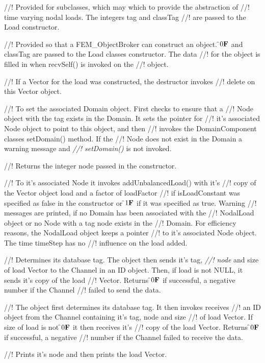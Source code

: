 //! Provided for subclasses, which may which to provide the abstraction of
//! time varying nodal loads. The integers \p tag and \p classTag
//! are passed to the Load constructor.

//! Provided so that a FEM\_ObjectBroker can construct an object. \f$0{\bf F}$ and
\p classTag are passed to the Load classes constructor. The data
//! for the object is filled in when recvSelf() is invoked on the
//! object.

//! If a Vector for the load was constructed, the destructor invokes
//! delete on this Vector object.


//! To set the associated Domain object. First checks to ensure that a
//! Node object with the tag exists in the Domain. It sets the pointer for
//! it's associated Node object to point to this object, and then 
//! invokes the DomainComponent classes setDomain() method. If the
//! Node does not exist in the Domain a warning message and {\em
//! setDomain()} is not invoked.

//! Returns the integer \p node passed in the constructor.

//! To it's associated Node it invokes addUnbalancedLoad() with it's
//! copy of the Vector object \p load and a factor of \p loadFactor
//! if \p isLoadConstant was specified as \p false in the constructor or
\f$1{\bf F}$ if it was specified as \p true. Warning
//! messages are printed, if no Domain has been associated with the
//! NodalLoad object or no Node with a tag \p node exists in the
//! Domain. For efficiency reasons, the NodalLoad object keeps a pointer
//! to it's associated Node object. The time \p timeStep has no
//! influence on the load added.

//! Determines its database tag. The object then sends it's tag, {\em
//! node} and size of load Vector to the Channel in an ID object. Then, if
\p load is not NULL, it sends it's copy of the \p load
//! Vector. Returns \f$0{\bf F}$ if successful, a negative number if the Channel
//! failed to send the data.  

//! The object first determines its database tag. It then invokes receives
//! an ID object from the Channel containing it's tag, \p node and size
//! of load Vector. If size of \p load is not \f$0{\bf F}$ it then receives it's
//! copy of the \p load Vector. Returns \f$0{\bf F}$ if successful, a negative 
//! number if the Channel failed to receive the data. 

//! Prints it's \p node and then prints the load Vector.

